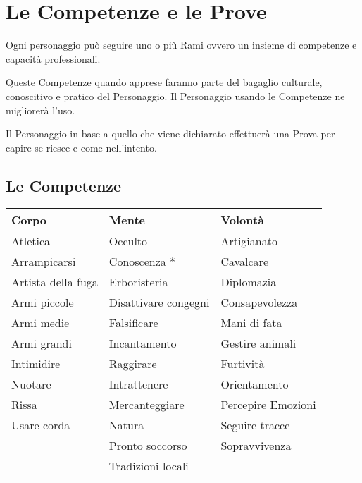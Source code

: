 \documentclass[12pt,a4paper,twoside,openany]{book}
\begin{document}
\pagebreak

\section{Le Competenze e le Prove}

\begin{multicols}{2}

Ogni personaggio può seguire uno o più Rami ovvero un insieme di competenze e capacità professionali.

Queste Competenze quando apprese faranno parte del bagaglio culturale, conoscitivo e pratico del Personaggio. Il Personaggio usando le Competenze ne migliorerà l'uso.

Il Personaggio in base a quello che viene dichiarato effettuerà una Prova per capire se riesce e come nell'intento. 

\end{multicols}

\subsection{Le Competenze}

\begin{tabular*}{0.93\linewidth}{@{\extracolsep{\fill}}lll}
\textbf{Corpo} & \textbf{Mente} & \textbf{Volontà}\\
\toprule
Atletica				& Occulto					& Artigianato			\\	
Arrampicarsi			& Conoscenza *				& Cavalcare				\\
Artista della fuga		& Erboristeria				& Diplomazia			\\
Armi piccole 			& Disattivare congegni		& Consapevolezza	\\
Armi medie 				& Falsificare				& Mani di fata\\
Armi grandi			& Incantamento				& Gestire animali\\
Intimidire		 		& Raggirare					& Furtività\\
Nuotare					& Intrattenere				& Orientamento\\
Rissa					& Mercanteggiare			& Percepire Emozioni \\ 
Usare corda		 		& Natura					& Seguire tracce\\
						& Pronto soccorso			& Sopravvivenza\\
						& Tradizioni locali			& \\

\end{tabular*}\\
\end{document}
